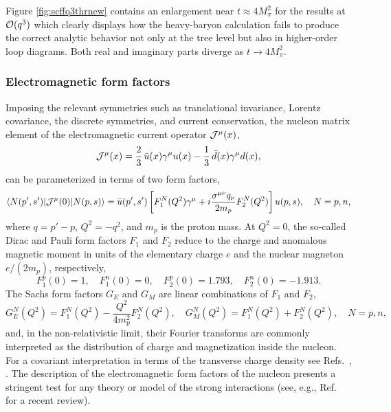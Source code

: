 \documentclass[twoside,12pt]{article}
\begin{document}
   Figure \ref{fig:scffq3thrnew} contains an enlargement near
$t\approx 4 M_\pi^2$ for the results at ${\cal O}(q^3)$ which
clearly displays how the heavy-baryon calculation
fails to produce the correct analytic behavior
not only at the tree level but also in higher-order loop diagrams.
   Both real and imaginary parts diverge as $t\to 4 M_\pi^2$.

\subsubsection{Electromagnetic form factors}
\label{subsectionemff}
   Imposing the relevant symmetries such as translational invariance,
Lorentz covariance, the discrete symmetries, and current
conservation, the nucleon matrix element of the electromagnetic
current operator ${\cal J}^\mu(x)$,
\begin{displaymath}
{\cal J}^{\mu}(x)
=\frac{2}{3}\,\bar{u}(x)\gamma^{\mu}u(x)
-\frac{1}{3}\,\bar{d}(x)\gamma^{\mu}d(x),
\end{displaymath}
can be parameterized in terms of two form factors,
\begin{equation}
\label{H1:emff:empar} \langle N(p',s')|{\cal J}^{\mu}(0)|N(p,s)\rangle=
\bar{u}(p',s')\left[F_1^N(Q^2)\gamma^\mu
+i\frac{\sigma^{\mu\nu}q_\nu}{2m_p}F_2^N(Q^2) \right]u(p,s),\quad
N=p,n,
\end{equation}
   where $q=p'-p$, $Q^2=-q^2$, and $m_p$ is the proton mass.
   At $Q^2=0$, the so-called Dirac and Pauli form factors $F_1$ and
$F_2$ reduce to the charge and anomalous magnetic moment in units of
the elementary charge $e$ and the nuclear magneton $e/(2m_p)$,
respectively,
\begin{displaymath}
F_1^{p}(0)=1,\quad F_1^{n}(0)=0,\quad F_2^{p}(0)=1.793,\quad
F_2^{n}(0)=-1.913.
\end{displaymath}
   The Sachs form factors $G_E$ and $G_M$ are linear combinations of
$F_1$ and $F_2$,
\begin{displaymath}
G_E^N(Q^2)=F_1^N(Q^2)-\frac{Q^2}{4m_p^2}F_2^N(Q^2),\quad
G_M^N(Q^2)=F_1^N(Q^2)+F_2^N(Q^2), \quad N=p,n,
\end{displaymath}
and, in the non-relativistic limit, their Fourier transforms are
commonly interpreted as the distribution of charge and magnetization
inside the nucleon.
   For a covariant interpretation in terms of the transverse charge
density see Refs.\ \cite{Miller:2007uy}, \cite{Carlson:2007xd}.
   The description of the electromagnetic form factors of the nucleon
presents a stringent test for any theory or model of the strong
interactions (see, e.g., Ref.~\cite{Perdrisat:2006hj} for a recent review).
\end{document}
